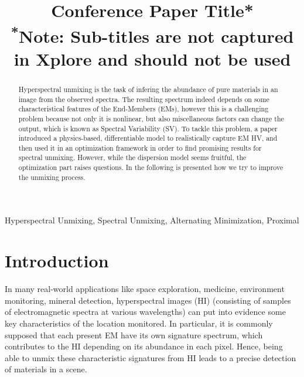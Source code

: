 \documentclass[conference]{IEEEtran}
\begin{document}
\title{Conference Paper Title*\\
{\footnotesize \textsuperscript{*}Note: Sub-titles are not captured in Xplore and
should not be used}
}

\author{
\and
{}
}

\maketitle

\begin{abstract}
  Hyperspectral unmixing is the task of infering the abundance of pure materials in an image from the observed spectra. The resulting spectrum indeed depends on some characteristical features of the End-Members (EMs), however this is a challenging problem because not only it is nonlinear, but also miscellaneous factors can change the output, which is known as Spectral Variability (SV). To tackle this problem, a paper~\cite{janiczek_differentiable_2020} introduced a physics-based, differentiable model to realistically capture EM HV, and then used it in an optimization framework in order to find promising results for spectral unmixing. However, while the dispersion model seems fruitful, the optimization part raises questions. In the following is presented how we try to improve the unmixing process.
\end{abstract}

\begin{IEEEkeywords}
Hyperspectral Unmixing, Spectral Unmixing, Alternating Minimization, Proximal
\end{IEEEkeywords}

\section{Introduction}
In many real-world applications like space exploration, medicine, environment monitoring, mineral detection, hyperspectral images (HI) (consisting of samples of electromagnetic spectra at various wavelengths) can put into evidence some key characteristics of the location monitored. In particular, it is commonly supposed that each present EM have its own signature spectrum, which contributes to the HI depending on its abundance in each pixel. Hence, being able to unmix these characteristic signatures from HI leads to a precise detection of materials in a scene.
\end{document}
